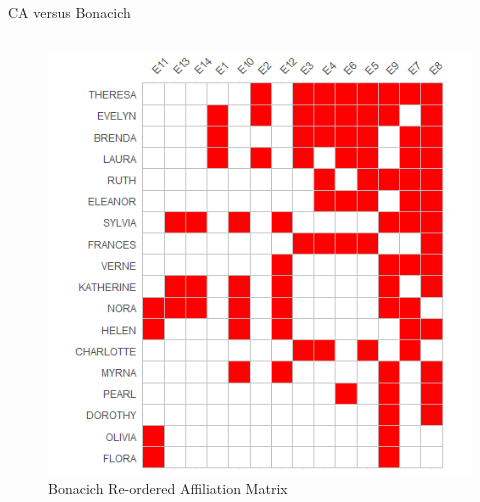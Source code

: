 \documentclass[
  ignorenonframetext,
]{beamer}
\begin{document}
\begin{frame}{CA versus Bonacich}
\begin{columns}[T]
\begin{column}{0.5\textwidth}
\begin{figure}
{\centering \includegraphics{Plots/bon-reord.png}

}

\caption{Bonacich Re-ordered Affiliation Matrix}

\end{figure}
\end{column}
\end{columns}
\end{frame}
\end{document}
